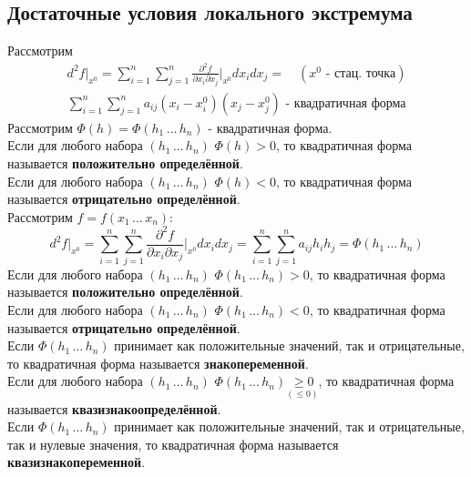 \documentclass[12pt]{article}
\begin{document}
    \subsection{Достаточные условия локального экстремума}
    Рассмотрим
    \begin{gather*}
        d^2 f \Big|_{x^0} = \sum_{i=1}^{n}\sum_{j=1}^{n} \frac{\partial^2 f}{\partial x_i \partial x_j} \Big|_{x^0} dx_i dx_j = \quad (x^0 \text{ - стац. точка})\\
        \sum_{i=1}^{n}\sum_{j=1}^{n}a_{ij}(x_i - x^0_i)(x_j - x^0_j) \text{ - квадратичная форма}
    \end{gather*}
    Рассмотрим $\Phi (h) = \Phi (h_1\, \dots\, h_n)$ - квадратичная форма.\\
    Если для любого набора $(h_1\, \dots\, h_n)$ $\Phi(h) > 0$, то квадратичная форма называется \textbf{положительно определённой}.\\
    Если для любого набора $(h_1\, \dots\, h_n)$ $\Phi(h) < 0$, то квадратичная форма называется \textbf{отрицательно определённой}.\\
    Рассмотрим $f = f(x_1\, \dots\, x_n)$:
    \[ d^2 f \Big|_{x^0} = \sum_{i=1}^{n}\sum_{j=1}^{n} \frac{\partial^2 f}{\partial x_i \partial x_j} \Big|_{x^0} dx_i dx_j = \sum_{i=1}^{n}\sum_{j=1}^{n}a_{ij}h_ih_j = \Phi(h_1\, \dots\, h_n) \]
    Если для любого набора $(h_1\, \dots\, h_n)$ $\Phi(h_1\, \dots\, h_n) > 0$, то квадратичная форма называется \textbf{положительно определённой}.\\
    Если для любого набора $(h_1\, \dots\, h_n)$ $\Phi(h_1\, \dots\, h_n) < 0$, то квадратичная форма называется \textbf{отрицательно определённой}.\\
    Если $\Phi(h_1\, \dots\, h_n)$ принимает как положительные значений, так и отрицательные, то квадратичная форма называется \textbf{знакопеременной}.\\
    Если для любого набора $(h_1\, \dots\, h_n)$ $\Phi(h_1\, \dots\, h_n) \underset{(\le 0)}{\ge 0}$, то квадратичная форма называется \textbf{квазизнакоопределённой}.\\
    Если $\Phi(h_1\, \dots\, h_n)$ принимает как положительные значений, так и отрицательные, так и нулевые значения, то квадратичная форма называется \textbf{квазизнакопеременной}.
\end{document}
